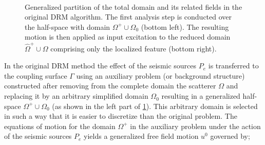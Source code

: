 \documentclass[12pt,letterpaper]{article}
\begin{document}
\begin{figure}[H]
\centering
{}\\
\caption{Generalized partition of the total domain and its related fields in the original DRM algorithm. The first analysis step is conducted over the half-space with domain $\Omega^+ \cup \Omega_0$ (bottom left). The resulting motion is then applied as input excitation to the reduced domain $\hat{\Omega} ^+ \cup \Omega$ comprising only the localized feature (bottom right).}
\label{fig:bielak}
\end{figure}



In the original DRM method the effect of the seismic sources $P_e$ is transferred to the coupling surface $\Gamma$ using an auxiliary problem (or background structure) constructed after removing from the complete domain the scatterer $\Omega$ and replacing it by an arbitrary simplified domain $\Omega_0$ resulting in a generalized half-space $\Omega^+ \cup \Omega_0$ (as shown in the left part of \cref{fig:bielak}). This arbitrary domain is selected in such a way that it is easier to discretize than the original problem. The equations of motion for the domain $\Omega^+$ in the auxiliary problem under the action of the seismic sources $P_e$ yields a generalized free field motion $u^0$ governed by;
\end{document}
